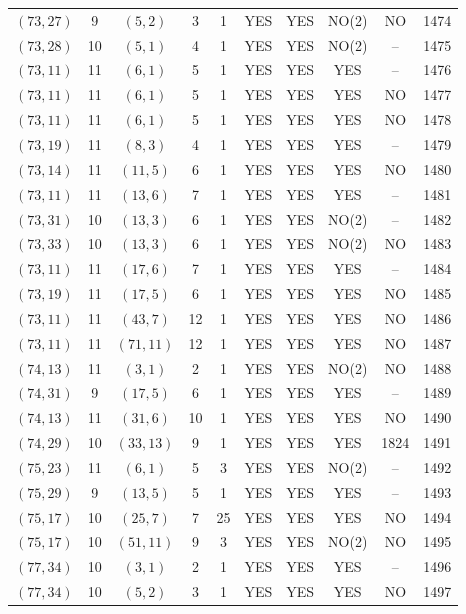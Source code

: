 \begin{longtable}{|c|c|c|c|c|c|c|c|c|c|}
$(73, 27)$ & 9 & $(5, 2)$ & 3 & 1 & YES & YES & NO(2) & NO & 1474\\
$(73, 28)$ & 10 & $(5, 1)$ & 4 & 1 & YES & YES & NO(2) & -- & 1475\\
$(73, 11)$ & 11 & $(6, 1)$ & 5 & 1 & YES & YES & YES & -- & 1476\\
$(73, 11)$ & 11 & $(6, 1)$ & 5 & 1 & YES & YES & YES & NO & 1477\\
$(73, 11)$ & 11 & $(6, 1)$ & 5 & 1 & YES & YES & YES & NO & 1478\\
$(73, 19)$ & 11 & $(8, 3)$ & 4 & 1 & YES & YES & YES & -- & 1479\\
$(73, 14)$ & 11 & $(11, 5)$ & 6 & 1 & YES & YES & YES & NO & 1480\\
$(73, 11)$ & 11 & $(13, 6)$ & 7 & 1 & YES & YES & YES & -- & 1481\\
$(73, 31)$ & 10 & $(13, 3)$ & 6 & 1 & YES & YES & NO(2) & -- & 1482\\
$(73, 33)$ & 10 & $(13, 3)$ & 6 & 1 & YES & YES & NO(2) & NO & 1483\\
$(73, 11)$ & 11 & $(17, 6)$ & 7 & 1 & YES & YES & YES & -- & 1484\\
$(73, 19)$ & 11 & $(17, 5)$ & 6 & 1 & YES & YES & YES & NO & 1485\\
$(73, 11)$ & 11 & $(43, 7)$ & 12 & 1 & YES & YES & YES & NO & 1486\\
$(73, 11)$ & 11 & $(71, 11)$ & 12 & 1 & YES & YES & YES & NO & 1487\\
$(74, 13)$ & 11 & $(3, 1)$ & 2 & 1 & YES & YES & NO(2) & NO & 1488\\
$(74, 31)$ & 9 & $(17, 5)$ & 6 & 1 & YES & YES & YES & -- & 1489\\
$(74, 13)$ & 11 & $(31, 6)$ & 10 & 1 & YES & YES & YES & NO & 1490\\
$(74, 29)$ & 10 & $(33, 13)$ & 9 & 1 & YES & YES & YES & 1824 & 1491\\
$(75, 23)$ & 11 & $(6, 1)$ & 5 & 3 & YES & YES & NO(2) & -- & 1492\\
$(75, 29)$ & 9 & $(13, 5)$ & 5 & 1 & YES & YES & YES & -- & 1493\\
$(75, 17)$ & 10 & $(25, 7)$ & 7 & 25 & YES & YES & YES & NO & 1494\\
$(75, 17)$ & 10 & $(51, 11)$ & 9 & 3 & YES & YES & NO(2) & NO & 1495\\
$(77, 34)$ & 10 & $(3, 1)$ & 2 & 1 & YES & YES & YES & -- & 1496\\
$(77, 34)$ & 10 & $(5, 2)$ & 3 & 1 & YES & YES & YES & NO & 1497\\

\end{longtable}
